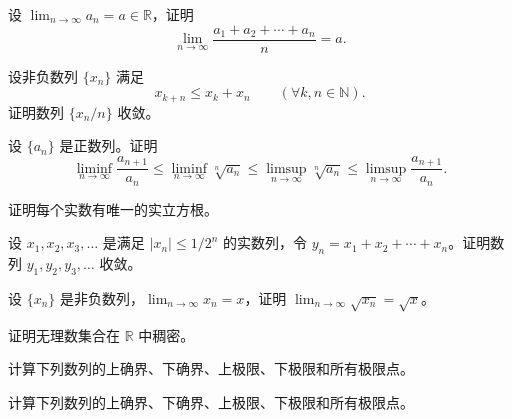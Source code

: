 \noindent\begin{minipage}{\textwidth}
设 $\lim_{n\to\infty}a_n=a\in\mathbb R$，证明\[\lim_{n\to\infty}\frac{a_1+a_2+\cdots+a_n}{n}=a.\]
\end{minipage}\par\vfill
\noindent\begin{minipage}{\textwidth}
设非负数列 $\{x_n\}$ 满足\[x_{k+n}\le x_k+x_n\qquad(\forall k,n\in\mathbb N).\]证明数列 $\{x_n/n\}$ 收敛。
\end{minipage}\par\vfill
\newpage
\noindent\begin{minipage}{\textwidth}
设 $\{a_n\}$ 是正数列。证明\[\liminf_{n\to\infty}\frac{a_{n+1}}{a_n}\le\liminf_{n\to\infty}\sqrt[n]{a_n}\le\limsup_{n\to\infty}\sqrt[n]{a_n}\le\limsup_{n\to\infty}\frac{a_{n+1}}{a_n}.\]
\end{minipage}\par\vfill
\noindent\begin{minipage}{\textwidth}
证明每个实数有唯一的实立方根。
\end{minipage}\par\vfill
\noindent\begin{minipage}{\textwidth}
设 $x_1,x_2,x_3,\ldots$ 是满足 $|x_n|\le 1/2^n$ 的实数列，令 $y_n=x_1+x_2+\cdots+x_n$。证明数列 $y_1,y_2,y_3,\ldots$ 收敛。
\end{minipage}\par\vfill
\noindent\begin{minipage}{\textwidth}
设 $\{x_n\}$ 是非负数列，$\lim_{n\to\infty}x_n=x$，证明 $\lim_{n\to\infty}\sqrt{x_n}=\sqrt{x}$。
\end{minipage}\par\vfill
\newpage
\noindent\begin{minipage}{\textwidth}
证明无理数集合在 $\mathbb R$ 中稠密。
\end{minipage}\par\vfill
\noindent\begin{minipage}{\textwidth}
计算下列数列的上确界、下确界、上极限、下极限和所有极限点。
\end{minipage}\par\vfill
\noindent\begin{minipage}{\textwidth}
计算下列数列的上确界、下确界、上极限、下极限和所有极限点。
\end{minipage}\par\vfill
